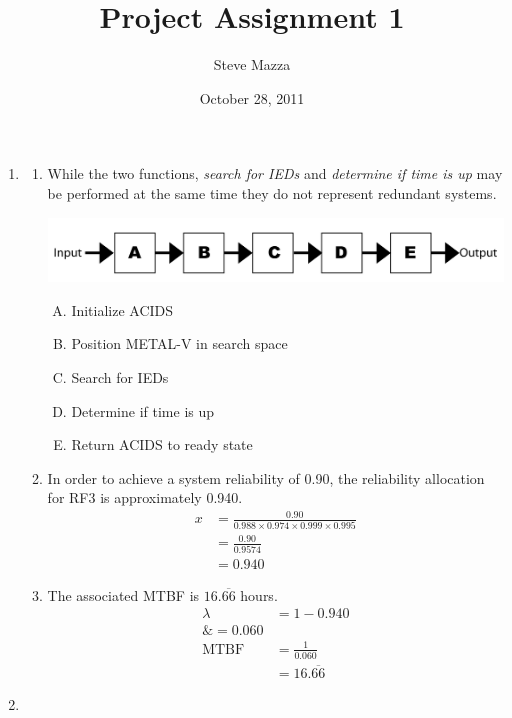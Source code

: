 \documentclass[letterpaper,10pt]{article}
\title{Project Assignment 1}
\author{Steve Mazza}
\date{October 28, 2011}
\begin{document}
	\maketitle

	\begin{enumerate}
		\item %
			\begin{enumerate}
				\item While the two functions, \emph{search for IEDs} and \emph{determine if time is up} may be performed at the same time they do not represent redundant systems.
					\begin{center}
						\includegraphics[scale=0.75]{ProjectAssignment1-1a.png}
					\end{center}
					\begin{enumerate}[A)]
						\item Initialize ACIDS
						\item Position METAL-V in search space
						\item Search for IEDs
						\item Determine if time is up
						\item Return ACIDS to ready state
					\end{enumerate}
				\item In order to achieve a system reliability of 0.90, the reliability allocation for RF3 is approximately 0.940.
					\begin{align*}
						x &= \frac{0.90}{0.988\times 0.974\times 0.999\times 0.995} \\
						&= \frac{0.90}{0.9574} \\
						&= 0.940
					\end{align*}
				\item The associated MTBF is $16.\overline{66}$ hours.
					\begin{align*}
						\lambda &= 1 - 0.940 \\
						\&= 0.060 \\
						\mbox{MTBF} &= \frac{1}{0.060} \\
						&= 16.\overline{66}
					\end{align*}
			\end{enumerate}
		\item %
			\begin{enumerate}

\end{enumerate}
\end{enumerate}
\end{document}
